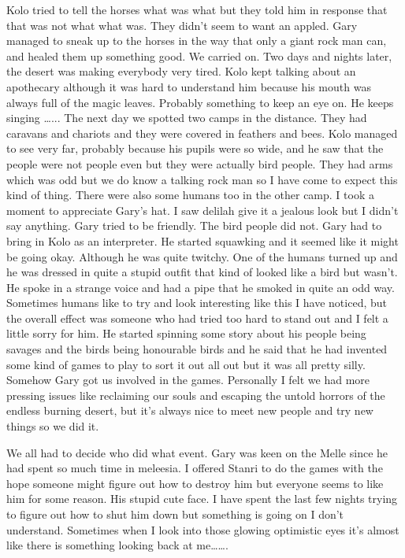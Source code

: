 Kolo tried to tell the horses what was what but they told him in response that that was not what what was. They didn’t seem to want an appled. Gary managed to sneak up to the horses in the way that only a giant rock man can, and healed them up something good. We carried on. Two days and nights later, the desert was making everybody very tired. Kolo kept talking about an apothecary although it was hard to understand him because his mouth was always full of the magic leaves. Probably something to keep an eye on. He keeps singing …... The next day we spotted two camps in the distance. They had caravans and chariots and they were covered in feathers and bees. Kolo managed to see very far, probably because his pupils were so wide, and he saw that the people were not people even but they were actually bird people. They had arms which was odd but we do know a talking rock man so I have come to expect this kind of thing. There were also some humans too in the other camp. I took a moment to appreciate Gary’s hat. I saw delilah give it a jealous look but I didn’t say anything. Gary tried to be friendly. The bird people did not. Gary had to bring in Kolo as an interpreter. He started squawking and it seemed like it might be going okay. Although he was quite twitchy. One of the humans turned up and he was dressed in quite a stupid outfit that kind of looked like a bird but wasn’t. He spoke in a strange voice and had a pipe that he smoked in quite an odd way. Sometimes humans like to try and look interesting like this I have noticed, but the overall effect was someone who had tried too hard to stand out and I felt a little sorry for him. He started spinning some story about his people being savages and the birds being honourable birds and he said that he had invented some kind of games to play to sort it out all out but it was all pretty silly. Somehow Gary got us involved in the games. Personally I felt we had more pressing issues like reclaiming our souls and escaping the untold horrors of the endless burning desert, but it’s always nice to meet new people and try new things so we did it.\medskip

We all had to decide who did what event. Gary was keen on the Melle since he had spent so much time in meleesia. I offered Stanri to do the games with the hope someone might figure out how to destroy him but everyone seems to like him for some reason. His stupid cute face. I have spent the last few nights trying to figure out how to shut him down but something is going on I don’t understand. Sometimes when I look into those glowing optimistic eyes it’s almost like there is something looking back at me…….\medskip

